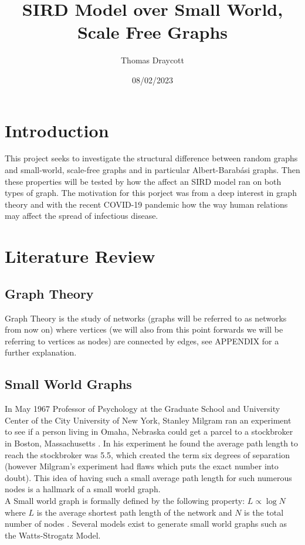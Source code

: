 \documentclass{article}
\title{SIRD Model over Small World, Scale Free Graphs}
\date{08/02/2023}
\author{Thomas Draycott}
\begin{document}
    \maketitle
    \newpage
    \section{Introduction}
    This project seeks to investigate the structural difference between random graphs and small-world, scale-free graphs and in particular Albert-Barabási graphs. Then these properties will be tested by how the affect an SIRD model ran on both types of graph. The motivation for this porject was from a deep interest in graph theory and with the recent COVID-19 pandemic how the way human relations may affect the spread of infectious disease.
    


    \section{Literature Review}
        \subsection{Graph Theory}
        Graph Theory is the study of networks (graphs will be referred to as networks from now on) where vertices (we will also from this point forwards we will be referring to vertices as nodes) are connected by edges, see APPENDIX for a further explanation.
        \subsection{Small World Graphs}
        In May 1967 Professor of Psychology at the Graduate School and University Center of the City University of New York, Stanley Milgram ran an experiment to see if a person living
        in Omaha, Nebraska could get a parcel to a stockbroker in Boston, Massachusetts \parencite{milgram1967small}. In his experiment he found the average path length to reach the stockbroker was 5.5, which created the term
        six degrees of separation (however Milgram's experiment had flaws which puts the exact number into doubt). This idea of having such a small average path length for such numerous nodes is a hallmark of a small world graph.\\
        A Small world graph is formally defined by the following property: $L\propto\log{N}$ where $L$ is the average shortest path length of the network and $N$ is the total number of nodes \parencite{Watts1998}. Several models exist to generate small world graphs such as the Watts-Strogatz Model.
\end{document}
